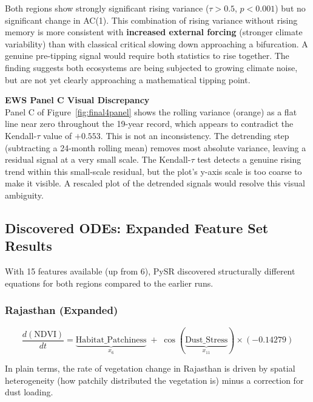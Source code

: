 \documentclass[12pt, a4paper]{article}
\begin{document}
Both regions show strongly significant rising variance ($\tau > 0.5$,
$p < 0.001$) but no significant change in AC(1). This combination of
rising variance without rising memory is more consistent with
\textbf{increased external forcing} (stronger climate variability) than
with classical critical slowing down approaching a bifurcation. A genuine
pre-tipping signal would require both statistics to rise together. The
finding suggests both ecosystems are being subjected to growing climate
noise, but are not yet clearly approaching a mathematical tipping point.

\begin{mdframed}[style=warnbox]
\textbf{\textcolor{warnred}{EWS Panel C Visual Discrepancy}}\\[4pt]
Panel C of Figure~\ref{fig:final4panel} shows the rolling variance
(orange) as a flat line near zero throughout the 19-year record, which
appears to contradict the Kendall-$\tau$ value of $+0.553$. This is not
an inconsistency. The detrending step (subtracting a 24-month rolling
mean) removes most absolute variance, leaving a residual signal at a
very small scale. The Kendall-$\tau$ test detects a genuine rising trend
within this small-scale residual, but the plot's y-axis scale is too
coarse to make it visible. A rescaled plot of the detrended signals
would resolve this visual ambiguity.
\end{mdframed}

\subsection{Discovered ODEs: Expanded Feature Set Results}

With 15 features available (up from 6), PySR discovered structurally
different equations for both regions compared to the earlier runs.

\subsubsection{Rajasthan (Expanded)}

\begin{equation}
    \frac{d(\text{NDVI})}{dt} =
    \underbrace{\text{Habitat\_Patchiness}}_{x_6}
    \;+\;
    \cos\!\left(\underbrace{\text{Dust\_Stress}}_{x_{11}}\right)
    \times (-0.14279)
    \label{eq:raj_expanded}
\end{equation}

In plain terms, the rate of vegetation change in Rajasthan is driven by
spatial heterogeneity (how patchily distributed the vegetation is) minus
a correction for dust loading.
\end{document}
